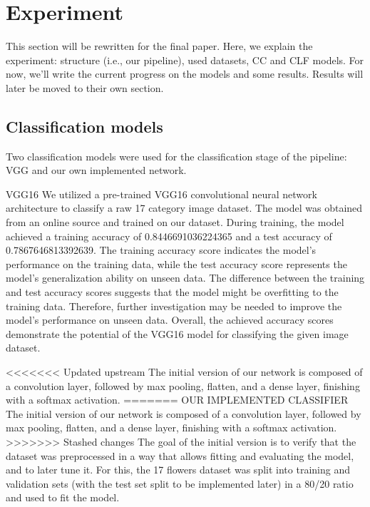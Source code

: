 

\section{Experiment}

This section will be rewritten for the final paper. Here, we explain the experiment: structure (i.e., our pipeline), used datasets, CC and CLF models.
For now, we'll write the current progress on the models and some results. Results will later be moved to their own section.

\subsection{Classification models}

Two classification models were used for the classification stage of the pipeline: VGG and our own implemented network. %
 

VGG16
We utilized a pre-trained VGG16 convolutional neural network architecture to classify a raw 17 category image dataset. 
The model was obtained from an online source and trained on our dataset. During training, the model achieved a training accuracy of 0.8446691036224365 and a test accuracy of 0.7867646813392639. 
The training accuracy score indicates the model's performance on the training data, while the test accuracy score represents the model's generalization ability on unseen data. 
The difference between the training and test accuracy scores suggests that the model might be overfitting to the training data. Therefore, further investigation may be needed to improve the model's performance on unseen data.
Overall, the achieved accuracy scores demonstrate the potential of the VGG16 model for classifying the given image dataset. 

<<<<<<< Updated upstream
The initial version of our network is composed of a convolution layer, followed by max pooling, flatten, and a dense layer, finishing with a softmax activation.
=======
OUR IMPLEMENTED CLASSIFIER 
The initial version of our network is composed of a convolution layer, followed by max pooling, flatten, and a dense layer, finishing with a softmax activation. 
>>>>>>> Stashed changes
The goal of the initial version is to verify that the dataset was preprocessed in a way that allows fitting and evaluating the model, and to later tune it.
For this, the 17 flowers dataset was split into training and validation sets (with the test set split to be implemented later) in a 80/20 ratio and used to fit the model.

